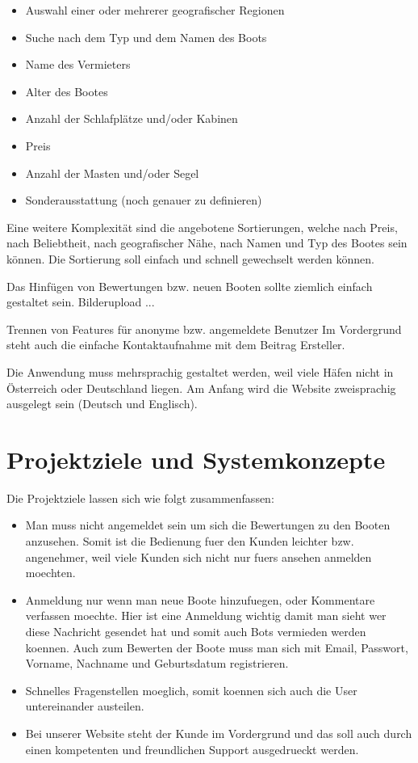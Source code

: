 \documentclass[12pt]{article}
\theoremstyle{definition}
\begin{document}
\begin{itemize}
   \item Auswahl einer oder mehrerer geografischer Regionen
   \item Suche nach dem Typ und dem Namen des Boots
   \item Name des Vermieters
   \item Alter des Bootes
   \item Anzahl der Schlafplätze und/oder Kabinen
   \item Preis
   \item Anzahl der Masten und/oder Segel
   \item Sonderausstattung (noch genauer zu definieren)
\end{itemize}

Eine weitere Komplexität sind die angebotene Sortierungen, welche nach Preis, nach Beliebtheit, nach geografischer Nähe, nach Namen und Typ des Bootes sein können. Die Sortierung soll einfach und schnell gewechselt werden können.

Das Hinfügen von Bewertungen bzw. neuen Booten sollte ziemlich einfach gestaltet sein. Bilderupload ...

Trennen von Features für anonyme bzw. angemeldete Benutzer
Im Vordergrund steht auch die einfache Kontaktaufnahme mit dem Beitrag Ersteller.

Die Anwendung muss mehrsprachig gestaltet werden, weil viele Häfen nicht in Österreich oder Deutschland liegen. Am Anfang wird die Website zweisprachig ausgelegt sein (Deutsch und Englisch).

\pagebreak

\section{Projektziele und Systemkonzepte}
Die Projektziele lassen sich wie folgt zusammenfassen:
\begin{itemize}
\item Man muss nicht angemeldet sein um sich die Bewertungen zu den Booten anzusehen. Somit ist die Bedienung fuer den Kunden leichter bzw. angenehmer, weil viele Kunden sich nicht nur fuers ansehen anmelden moechten.
\item Anmeldung nur wenn man neue Boote hinzufuegen, oder Kommentare verfassen moechte. Hier ist eine Anmeldung wichtig damit man sieht wer diese Nachricht gesendet hat und somit auch Bots vermieden werden koennen.
Auch zum Bewerten der Boote muss man sich mit Email, Passwort, Vorname, Nachname und Geburtsdatum registrieren.
\item Schnelles Fragenstellen moeglich, somit koennen sich auch die User untereinander austeilen.
\item Bei unserer Website steht der Kunde im Vordergrund und das soll auch durch einen kompetenten und freundlichen Support ausgedrueckt werden. 
\end{itemize}
\end{document}
